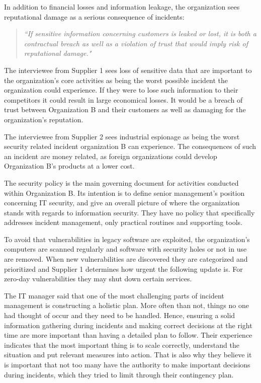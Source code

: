 In addition to financial losses and information leakage, the organization sees reputational damage as a serious consequence of incidents: 

\begin{quote}
\textit{``If sensitive information concerning customers is leaked or lost, it is both a contractual breach as well as a violation of trust that would imply risk of reputational damage."}
\end{quote}

The interviewee from Supplier 1 sees loss of sensitive data that are important to the organization's core activities as being the worst possible incident the organization could experience. If they were to lose such information to their competitors it could result in large economical losses. It would be a breach of trust between Organization B and their customers as well as damaging for the organization's reputation.	

The interviewee from Supplier 2 sees industrial espionage as being the worst security related incident organization B can experience. %
The consequences of such an incident are money related, as foreign organizations could develop Organization B's products at a lower cost. 

The security policy is the main governing document for activities conducted within Organization B. Its intention is to define senior management's position concerning IT security, and give an overall picture of where the organization stands with regards to information security. They have no policy that specifically addresses incident management, only practical routines and supporting tools.

To avoid that vulnerabilities in legacy software are exploited, the organization's computers are scanned regularly and software with security holes or not in use are removed. When new vulnerabilities are discovered they are categorized and prioritized and Supplier 1 determines how urgent the following update is. For zero-day vulnerabilities they may shut down certain services.

The \acs{IT} manager said that one of the most challenging parts of incident management is constructing a holistic plan. More often than not, things no one had thought of occur and they need to be handled. Hence, ensuring a solid information gathering during incidents and making correct decisions at the right time are more important than having a detailed plan to follow. Their experience indicates that the most important thing is to scale correctly, understand the situation and put relevant measures into action. That is also why they believe it is important that not too many have the authority to make important decisions during incidents, which they tried to limit through their contingency plan.

